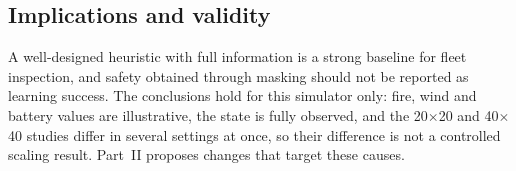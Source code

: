 \subsection{Implications and validity}

A well-designed heuristic with full information is a strong baseline for fleet inspection,
and safety obtained through masking should not be reported as learning success. The
conclusions hold for this simulator only: fire, wind and
battery values are illustrative, the state is fully observed, and the 20$\times$20 and
40$\times$40 studies differ in several settings at once, so their difference is not a
controlled scaling result. Part~II proposes changes that target these causes.
